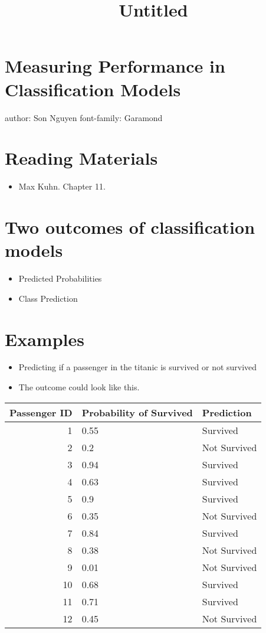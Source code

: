 \documentclass[
]{article}
\title{Untitled}
\author{}
\date{\vspace{-2.5em}}
\providecommand{\tightlist}{%
  \setlength{\itemsep}{0pt}\setlength{\parskip}{0pt}}
\begin{document}
\maketitle

\hypertarget{measuring-performance-in-classification-models}{%
\section{Measuring Performance in Classification
Models}\label{measuring-performance-in-classification-models}}

author: Son Nguyen font-family: Garamond

\hypertarget{reading-materials}{%
\section{Reading Materials}\label{reading-materials}}

\begin{itemize}
\tightlist
\item
  Max Kuhn. Chapter 11.
\end{itemize}

\hypertarget{two-outcomes-of-classification-models}{%
\section{Two outcomes of classification
models}\label{two-outcomes-of-classification-models}}

\begin{itemize}
\tightlist
\item
  Predicted Probabilities
\item
  Class Prediction
\end{itemize}

\hypertarget{examples}{%
\section{Examples}\label{examples}}

\begin{itemize}
\tightlist
\item
  Predicting if a passenger in the titanic is survived or not survived
\item
  The outcome could look like this.
\end{itemize}

\begin{longtable}[]{@{}rll@{}}
\toprule
Passenger ID & Probability of Survived & Prediction\tabularnewline
\midrule
\endhead
1 & 0.55 & Survived\tabularnewline
2 & 0.2 & Not Survived\tabularnewline
3 & 0.94 & Survived\tabularnewline
4 & 0.63 & Survived\tabularnewline
5 & 0.9 & Survived\tabularnewline
6 & 0.35 & Not Survived\tabularnewline
7 & 0.84 & Survived\tabularnewline
8 & 0.38 & Not Survived\tabularnewline
9 & 0.01 & Not Survived\tabularnewline
10 & 0.68 & Survived\tabularnewline
11 & 0.71 & Survived\tabularnewline
12 & 0.45 & Not Survived\tabularnewline
\bottomrule
\end{longtable}
\end{document}
